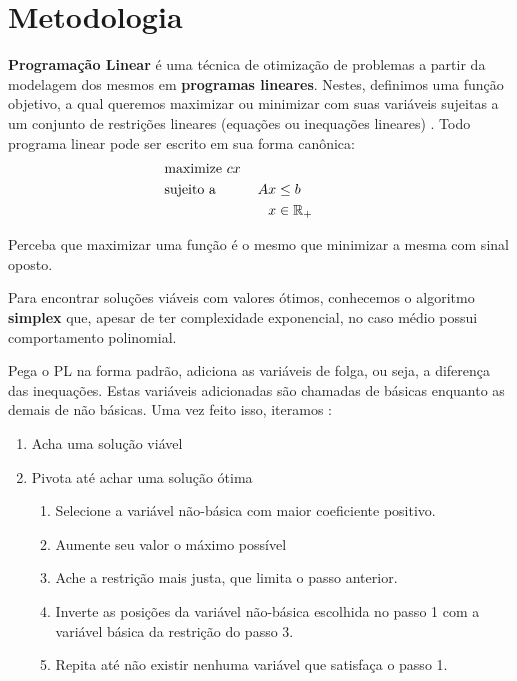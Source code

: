 \documentclass[11pt]{article}
\begin{document}
{\section{Metodologia}
\label{sec:org16fd295}

\textbf{Programação Linear} é uma técnica de otimização de problemas a partir da modelagem dos mesmos em \textbf{programas lineares}.
Nestes, definimos uma função objetivo, a qual queremos maximizar ou minimizar com suas variáveis sujeitas a um conjunto de restrições lineares (equações ou inequações lineares) \autocite{Chvatal1983LinearProgramming} . Todo programa linear pode ser escrito em sua forma canônica:
\begin{alignat*}{4}
& \omit\rlap{maximize  $\displaystyle cx$} \\
& \mbox{sujeito a}&& \quad & Ax & \leq b  & \quad &  \\
&                 &&       & x               & \in \mathbb{R}_+ &      &
\end{alignat*}

Perceba que maximizar uma função é o mesmo que minimizar a mesma com sinal oposto.

Para encontrar soluções viáveis com valores ótimos, conhecemos o algoritmo \textbf{simplex} que, apesar de ter complexidade exponencial, no caso médio possui comportamento polinomial.

Pega o PL na forma padrão, adiciona as variáveis de folga, ou seja, a diferença das inequações. Estas variáveis adicionadas são chamadas de básicas enquanto as demais de não básicas. Uma vez feito isso, iteramos :
\begin{enumerate}
\item Acha uma solução viável
\item Pivota até achar uma solução ótima
\begin{enumerate}
\item Selecione a variável não-básica com maior coeficiente positivo.
\item Aumente seu valor o máximo possível
\item Ache a restrição mais justa, que limita o passo anterior.
\item Inverte as posições da variável não-básica escolhida no passo 1 com a variável básica da restrição do passo 3.
\item Repita até não existir nenhuma variável que satisfaça o passo 1.
\end{enumerate}
\end{enumerate}

}
\end{document}
